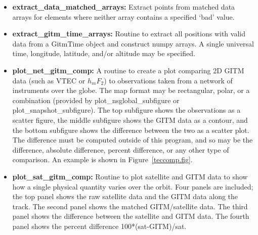 \begin{itemize}
\item[]{\bf extract\_data\_matched\_arrays: } Extract points from matched data arrays for elements where neither array contains a specified `bad' value.
\item[]{\bf extract\_gitm\_time\_arrays: } Routine to extract all positions with valid data from a GitmTime object and construct numpy arrays.  A single universal time, longitude, latitude, and/or altitude may be specified.
\item[]{\bf plot\_net\_gitm\_comp: } A routine to create a plot comparing 2D GITM data (such as VTEC or $h_mF_2$) to observations taken from a network of instruments over the globe.  The map format may be rectangular, polar, or a combination (provided by plot\_nsglobal\_subfigure or plot\_snapshot\_subfigure).  The top subfigure shows the observations as a scatter figure, the middle subfigure shows the GITM data as a contour, and the bottom subfigure shows the difference between the two as a scatter plot.  The difference must be computed outside of this program, and so may be the difference, absolute difference, percent difference, or any other type of comparison.  An example is shown in Figure~\ref{teccomp.fig}.
\item[]{\bf plot\_sat\_gitm\_comp: } Routine to plot satellite and GITM data to show how a single physical quantity varies over the orbit.  Four panels are included; the top panel shows the raw satellite data and the GITM data along the track.  The second panel shows the matched GITM/satellite data.  The third panel shows the difference between the satellite and GITM data.  The fourth panel shows the percent difference 100*(sat-GITM)/sat.
\end{itemize}

